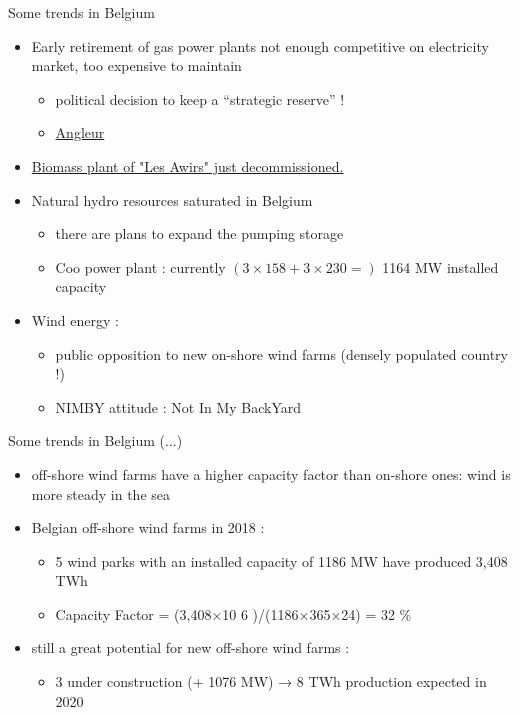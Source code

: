 \begin{frame}
{Some trends in Belgium}
\begin{itemize}
\item Early retirement of gas power plants not enough competitive on electricity market, too expensive to maintain
\begin{itemize}
\item political decision to keep a “strategic reserve” !
\item \href{https://edfluminus.edf.com/edf/la-centrale-electrique-d-angleur}{Angleur}
\end{itemize}
\item \href{https://www.rtbf.be/info/regions/liege/detail_flemalle-fermeture-de-la-plus-grande-centrale-biomasse-de-wallonie-aux-awirs?id=10555470}{Biomass plant of "Les Awirs" just decommissioned.}
\item Natural hydro resources saturated in Belgium
\begin{itemize}
\item there are plans to expand the pumping storage
\item Coo power plant : currently $(3 \times 158 + 3 \times 230 =) $ 1164 MW installed capacity
\end{itemize}
\item Wind energy :
\begin{itemize}
\item public opposition to new on-shore wind farms (densely populated country !)
\item NIMBY attitude : Not In My BackYard
\end{itemize}
\end{itemize}
\end{frame}

\begin{frame}
{Some trends in Belgium (...)}
\begin{itemize}
\item off-shore wind farms have a higher capacity factor than on-shore ones: wind is more steady in the sea
\item Belgian off-shore wind farms in 2018 :
\begin{itemize}
\item 5 wind parks with an installed capacity of 1186 MW have produced 3,408 TWh
\item Capacity Factor = (3,408×10 
6
 )/(1186×365×24) = 32 \%
\end{itemize}
\item still a great potential for new off-shore wind farms :
\begin{itemize}
\item 3 under construction (+ 1076 MW) → 8 TWh production expected in 2020
\end{itemize}
\end{itemize}
\end{frame}


